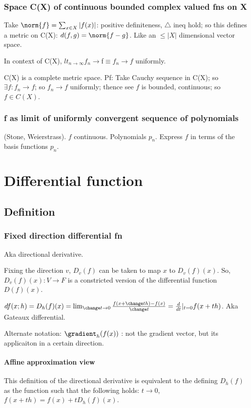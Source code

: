 \documentclass[oneside, article]{memoir}
\begin{document}
\subsection{Space C(X) of continuous bounded complex valued fns on X}
Take $\norm{f} = \sum_{x \in X} |f(x)|$: positive definiteness, $\triangle$ ineq hold; so this defines a metric on C(X): $d(f, g) = \norm{f-g}$. Like an $\leq |X|$ dimensional vector space.

In context of C(X), $lt_{n\to \infty} f_{n} \to $f$ \equiv f_{n} \to f$ uniformly.

C(X) is a complete metric space. Pf: Take Cauchy sequence in C(X); so $\exists f: f_{n} \to f$; so $f_{n} \to f$ uniformly; thence see $f$ is bounded, continuous; so $f\in C(X)$.

\subsection{f as limit of uniformly convergent sequence of polynomials}
(Stone, Weierstrass). $f$ continuous. Polynomials $p_{n}$. Express $f$ in terms of the basis functions $p_n$.

\tbc

\chapter{Differential function}
\section{Definition}
\subsection{Fixed direction differential fn}
Aka directional derivative.

Fixing the direction $v$, $D_v(f)$ can be taken to map $x$ to $D_v(f)(x)$. So, $D_v(f)(x): V \to F$ is a constricted version of the differential function $D(f)(x)$.

$df(x; h) = D_h(f)(x)= \lim_{\change t \to 0} \frac{f(x+\change th) - f(x)}{\change t} = \frac{d}{dt}|_{t=0}f(x + th)$. Aka Gateaux differential.

Alternate notation: $\gradient_{h}(f(x)) $ : not the gradient vector, but its applicaiton in a certain direction.

\subsubsection{Affine approximation view}
This definition of the directional derivative is equivalent to the defining $D_h(f)$ as the function such that the following holds: $t \to 0$, $f(x + th) = f(x) + tD_h(f)(x)$.
\end{document}
